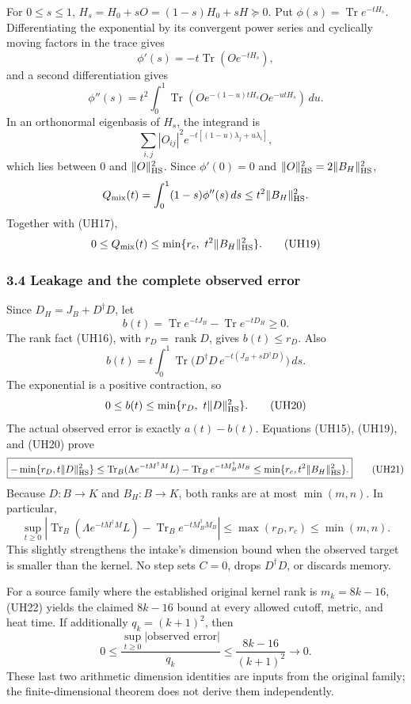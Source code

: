 \documentclass[11pt]{article}
\begin{document}
For \(0\le s\le1\), \(H_s=H_0+sO=(1-s)H_0+sH\succeq0\). Put \(\phi(s)=\operatorname{Tr}e^{-tH_s}\). Differentiating the exponential by its convergent power series and cyclically moving factors in the trace gives \[
 \phi'(s)=-t\operatorname{Tr}(Oe^{-tH_s}),
\] and a second differentiation gives \[
 \phi''(s)=t^2\int_0^1
       \operatorname{Tr}(Oe^{-(1-u)tH_s}Oe^{-utH_s})\,du.
 \tag{UH18}
\] In an orthonormal eigenbasis of \(H_s\), the integrand is \[
 \sum_{i,j}|O_{ij}|^2e^{-t[(1-u)\lambda_j+u\lambda_i]},
\] which lies between \(0\) and \(\|O\|_{\rm HS}^2\). Since \(\phi'(0)=0\) and \(\|O\|_{\rm HS}^2=2\|B_H\|_{\rm HS}^2\), \[
 Q_{\rm mix}(t)=\int_0^1(1-s)\phi''(s)\,ds
 \le t^2\|B_H\|_{\rm HS}^2.
\] Together with (UH17), \[
 0\le Q_{\rm mix}(t)
 \le \min\{r_c,\ t^2\|B_H\|_{\rm HS}^2\}.
 \tag{UH19}
\]

\subsubsection{3.4 Leakage and the complete observed error}\label{leakage-and-the-complete-observed-error}

Since \(D_H=J_B+D^\dagger D\), let \[
 b(t)=\operatorname{Tr}e^{-tJ_B}-\operatorname{Tr}e^{-tD_H}\ge0.
\] The rank fact (UH16), with \(r_D=\operatorname{rank}D\), gives \(b(t)\le r_D\). Also \[
 b(t)=t\int_0^1
 \operatorname{Tr}\bigl(D^\dagger D\,e^{-t(J_B+sD^\dagger D)}\bigr)\,ds.
\] The exponential is a positive contraction, so \[
 0\le b(t)\le\min\{r_D,\ t\|D\|_{\rm HS}^2\}.
 \tag{UH20}
\] The actual observed error is exactly \(a(t)-b(t)\). Equations (UH15), (UH19), and (UH20) prove \[
\boxed{
 -\min\{r_D,t\|D\|_{\rm HS}^2\}
 \le
 \operatorname{Tr}_B(\Lambda e^{-tM^\dagger M}L)
 -\operatorname{Tr}_B e^{-tM_B^\dagger M_B}
 \le
 \min\{r_c,t^2\|B_H\|_{\rm HS}^2\}.}
 \tag{UH21}
\] Because \(D:B\to K\) and \(B_H:B\to K\), both ranks are at most \(\min(m,n)\). In particular, \[
\boxed{
 \sup_{t\ge0}
 \left|
 \operatorname{Tr}_B(\Lambda e^{-tM^\dagger M}L)
 -\operatorname{Tr}_B e^{-tM_B^\dagger M_B}
 \right|
 \le\max(r_D,r_c)\le\min(m,n).}
 \tag{UH22}
\] This slightly strengthens the intake's dimension bound when the observed target is smaller than the kernel. No step sets \(C=0\), drops \(D^\dagger D\), or discards memory.

For a source family where the established original kernel rank is \(m_k=8k-16\), (UH22) yields the claimed \(8k-16\) bound at every allowed cutoff, metric, and heat time. If additionally \(q_k=(k+1)^2\), then \[
 0\le\frac{\sup_{t\ge0}|\text{observed error}|}{q_k}
 \le\frac{8k-16}{(k+1)^2}\longrightarrow0.
\] These last two arithmetic dimension identities are inputs from the original family; the finite-dimensional theorem does not derive them independently.
\end{document}
